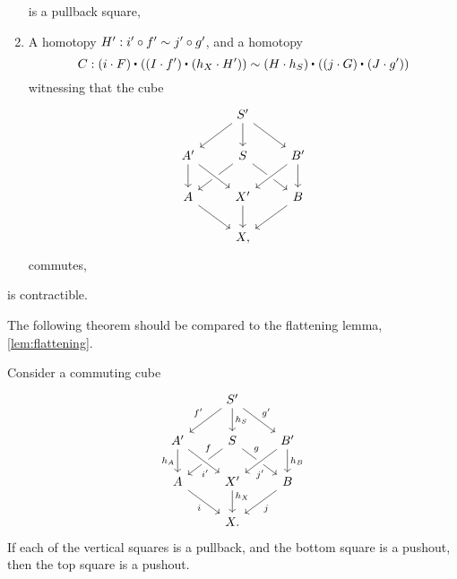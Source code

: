 \begin{cor}
\begin{enumerate}
is a pullback square,
\item A homotopy $H':i'\circ f'\sim j'\circ g'$, and a homotopy
\begin{equation*}
C : \ct{(i\cdot F)}{(\ct{(I\cdot f')}{(h_X\cdot H')})} \htpy \ct{(H\cdot h_S)}{(\ct{(j\cdot G)}{(J\cdot g')})}
\end{equation*}
witnessing that the cube
\begin{equation*}
\begin{tikzcd}
& S' \arrow[dl] \arrow[dr] \arrow[d] \\
A' \arrow[d] & S \arrow[dl] \arrow[dr] & B' \arrow[dl,crossing over] \arrow[d] \\
A \arrow[dr] & X' \arrow[d] \arrow[from=ul,crossing over] & B \arrow[dl] \\
& X,
\end{tikzcd}
\end{equation*}
commutes,
\end{enumerate}
is contractible.
\end{cor}

The following theorem should be compared to the flattening lemma, \cref{lem:flattening}.

\begin{thm}
Consider a commuting cube
\begin{equation*}
\begin{tikzcd}
& S' \arrow[dl,swap,"{f'}"] \arrow[dr,"{g'}"] \arrow[d,"h_S"] \\
A' \arrow[d,swap,"h_A"] & S \arrow[dl,swap,"f" near start] \arrow[dr,"g" near start] & B' \arrow[dl,crossing over,"{j'}" near end] \arrow[d,"h_B"] \\
A \arrow[dr,swap,"i"] & X' \arrow[d,"h_X" near start] \arrow[from=ul,crossing over,"{i'}"' near end] & B \arrow[dl,"j"] \\
& X.
\end{tikzcd}
\end{equation*}
If each of the vertical squares is a pullback, and the bottom square  is a pushout, then the top square is a pushout.
\end{thm}


